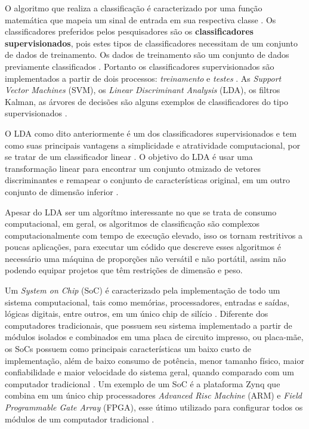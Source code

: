 O algoritmo que realiza a classificação é caracterizado por uma função matemática
que mapeia um sinal de entrada em sua respectiva classe \cite{lottephd}. Os classificadores
preferidos pelos pesquisadores são os \textbf{classificadores supervisionados}, pois estes
tipos de classificadores necessitam de um conjunto de dados de treinamento. Os dados de treinamento são um conjunto de dados previamente classificados \cite{Siulybook}. Portanto os classificadores supervisionados são implementados a partir de dois processos: \textit{treinamento} e \textit{testes} \cite{Siulybook}. As \textit{Support Vector Machines} (SVM), os \textit{Linear Discriminant Analysis} (LDA), os filtros Kalman, as árvores de decisões são alguns exemplos de classificadores do tipo supervisionados \cite{Siulybook}.

O LDA como dito anteriormente é um dos classificadores supervisionados e tem como suas principais vantagens
a simplicidade e atratividade computacional, por se tratar de um classificador linear \cite{patternRecogn}.
O objetivo do LDA é usar uma transformação linear para encontrar um conjunto otmizado de vetores
discriminantes e remapear o conjunto de características
original, em um outro conjunto de dimensão  inferior \cite{ShashoaLDA}.


Apesar do LDA ser um algorítmo interessante no que se trata de consumo computacional, em geral, os algoritmos de classificação são complexos computacionalmente com tempo de execução elevado,
isso os tornam restritivos a poucas aplicações, para executar um 
códido que descreve esses algoritmos é necessário uma máquina de proporções não versátil e não portátil,
assim não podendo equipar projetos que têm restrições de dimensão e peso.

Um \textit{System on Chip} (SoC) é caracterizado pela implementação de todo um sistema computacional, tais como memórias, processadores, entradas e saídas, lógicas digitais, entre outros, em um único chip de silício \cite{zynqBook}. Diferente dos computadores tradicionais, que possuem seu sistema implementado a partir de módulos isolados e combinados em uma placa de circuito impresso, ou placa-mãe, os SoCs possuem como principais características um baixo custo de implementação, além de baixo consumo de potência, menor tamanho físico, maior confiabilidade e maior velocidade do sistema geral, quando comparado com um computador tradicional \cite{zynqBook}. Um exemplo de um SoC é a plataforma Zynq que combina em um único chip processadores \textit{Advanced Risc Machine} (ARM) e \textit{Field Programmable Gate Array} (FPGA), esse útimo utilizado para configurar todos os módulos de um computador tradicional \cite{zynqBook}. 

